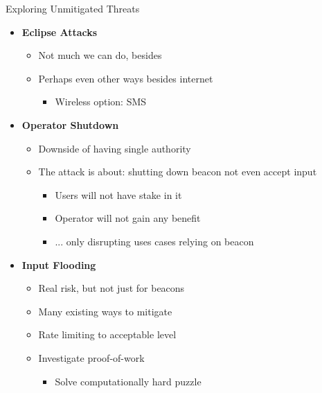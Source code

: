 \begin{frame}{Exploring Unmitigated Threats}
{\begin{multicols}{2}
\begin{itemize}
            \item \textbf{Eclipse Attacks}
            \begin{itemize}
                \item Not much we can do, besides
                \item Perhaps even other ways besides internet
                \begin{itemize}
                    \item Wireless option: SMS
                \end{itemize}
            \end{itemize}

            \item \textbf{Operator Shutdown}
            \begin{itemize}
                \item Downside of having single authority
                \item The attack is about: shutting down beacon \textrightarrow{} not even accept input
                \begin{itemize}
                    \item Users will not have stake in it
                    \item Operator will not gain any benefit
                    \item ... only disrupting uses cases relying on beacon
                \end{itemize}
            \end{itemize}

            \item \textbf{Input Flooding}
            \begin{itemize}
                \item Real risk, but not just for beacons
                \item Many existing ways to mitigate
                \item Rate limiting to acceptable level
                \item Investigate proof-of-work
                \begin{itemize}
                    \item Solve computationally hard puzzle
                \end{itemize}
            \end{itemize}
        \end{itemize}
    \end{multicols}
}\end{frame}



